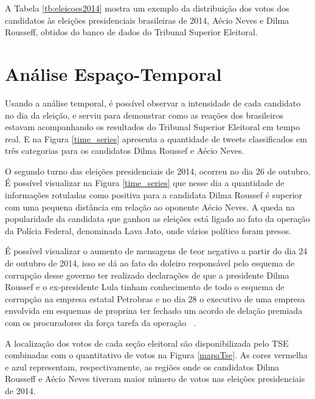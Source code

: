 A Tabela \ref{tb:eleicoes2014} mostra um exemplo da distribuição dos votos
dos candidatos às eleições presidenciais brasileiras de 2014,
Aécio Neves e Dilma Rousseff, obtidos do banco de dados do
Tribunal Superior Eleitoral.




\section{Análise Espaço-Temporal}


Usando a análise temporal, é possível observar a intensidade
de cada candidato no dia da eleição, e serviu para demonstrar
como as reações dos brasileiros estavam acompanhando os
resultados do Tribunal Superior Eleitoral em tempo real. E na
Figura \ref{time_series} apresenta a quantidade de tweets classificados
em três categorias para os candidatos Dilma Roussef e
Aécio Neves.

%


O segundo turno das eleições presidenciais de 2014, ocorreu no dia 26 de outubro. É possível visualizar na Figura \ref{time_series} que nesse dia
a quantidade de informações rotuladas como positiva para a candidata Dilma Roussef é superior com uma pequena distância em relação ao oponente Aécio
Neves. A queda na popularidade da candidata que ganhou as eleições está ligado ao fato da operação da Polícia Federal, denominada Lava Jato, onde
vários político foram presos. 

É possível visualizar o aumento de mensagens de teor negativo a partir do dia 24 de outubro de 2014, isso se dá ao fato do doleiro 
responsável pelo esquema de corrupção desse governo ter realizado declarações de que a presidente Dilma Roussef e o ex-presidente Lula tinham 
conhecimento de todo o esquema de corrupção na empresa estatal Petrobras e no dia 28 o executivo de uma empresa envolvida em esquemas de proprina
ter fechado um acordo de delação premiada com os procuradores da força tarefa da operação ~\cite{LavaJato}. 


A localização dos votos de cada seção eleitoral são disponibilizada pelo \acrshort{TSE}
combinadas com o quantitativo de votos na Figura \ref{mapaTse}. As cores
vermelha e azul representam, respectivamente, as regiões onde
os candidatos Dilma Rousseff e Aécio Neves tiveram maior número de votos nas eleições presidenciais de 2014.

